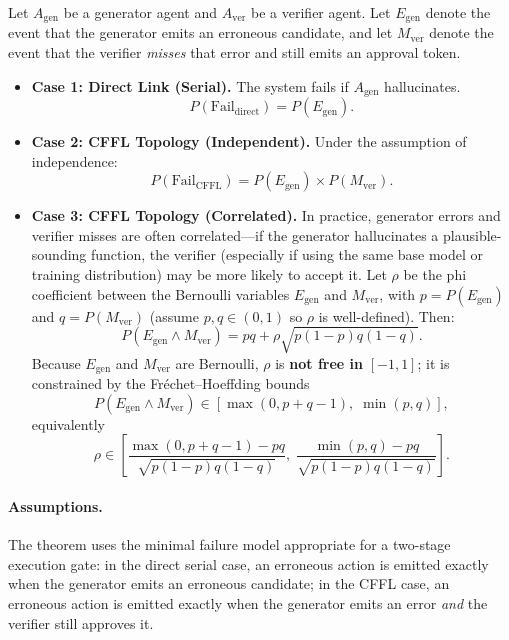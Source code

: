 \begin{theorem}\label{thm:cffl-error-suppression}
Let $A_{\mathrm{gen}}$ be a generator agent and $A_{\mathrm{ver}}$ be a verifier agent. Let
$E_{\mathrm{gen}}$ denote the event that the generator emits an erroneous candidate, and let
$M_{\mathrm{ver}}$ denote the event that the verifier \emph{misses} that error and still emits an approval token.
\begin{itemize}[leftmargin=*]
\item \textbf{Case 1: Direct Link (Serial).} The system fails if $A_{\mathrm{gen}}$ hallucinates.
\[
P(\mathrm{Fail}_{\mathrm{direct}}) = P(E_{\mathrm{gen}}).
\]
\item \textbf{Case 2: CFFL Topology (Independent).} Under the assumption of independence:
\[
P(\mathrm{Fail}_{\mathrm{CFFL}}) = P(E_{\mathrm{gen}})\times P(M_{\mathrm{ver}}).
\]
\item \textbf{Case 3: CFFL Topology (Correlated).} In practice, generator errors and verifier misses are often correlated---if the generator hallucinates a plausible-sounding function, the verifier (especially if using the same base model or training distribution) may be more likely to accept it. Let $\rho$ be the phi coefficient between the Bernoulli variables $E_{\mathrm{gen}}$ and $M_{\mathrm{ver}}$, with $p = P(E_{\mathrm{gen}})$ and $q = P(M_{\mathrm{ver}})$ (assume $p,q\in(0,1)$ so $\rho$ is well-defined). Then:
\[
P(E_{\mathrm{gen}} \wedge M_{\mathrm{ver}}) = pq + \rho\sqrt{p(1-p)q(1-q)}.
\]
Because $E_{\mathrm{gen}}$ and $M_{\mathrm{ver}}$ are Bernoulli, $\rho$ is \textbf{not free in} $[-1,1]$; it is constrained by the Fr\'echet--Hoeffding bounds
\[
P(E_{\mathrm{gen}} \wedge M_{\mathrm{ver}}) \in [\max(0,p+q-1),\;\min(p,q)],
\]
equivalently
\[
\rho \in \left[\frac{\max(0,p+q-1)-pq}{\sqrt{p(1-p)q(1-q)}},\;\frac{\min(p,q)-pq}{\sqrt{p(1-p)q(1-q)}}\right].
\]
\end{itemize}
\end{theorem}

\paragraph{Assumptions.}
The theorem uses the minimal failure model appropriate for a two-stage execution gate: in the direct serial case, an erroneous action is emitted exactly when the generator emits an erroneous candidate; in the CFFL case, an erroneous action is emitted exactly when the generator emits an error \emph{and} the verifier still approves it.

